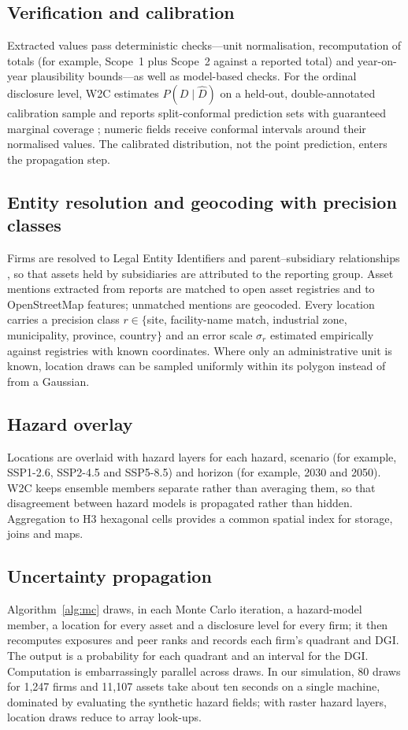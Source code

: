 \documentclass{article}
\theoremstyle{plain}
\theoremstyle{definition}
\begin{document}
\subsection{Verification and calibration}
Extracted values pass deterministic checks---unit normalisation, recomputation of totals (for example, Scope~1 plus Scope~2 against a reported total) and year-on-year plausibility bounds---as well as model-based checks. For the ordinal disclosure level, W2C estimates $P(D \mid \hat D)$ on a held-out, double-annotated calibration sample and reports split-conformal prediction sets with guaranteed marginal coverage \citep{angelopoulos2023gentle}; numeric fields receive conformal intervals around their normalised values. The calibrated distribution, not the point prediction, enters the propagation step.

\subsection{Entity resolution and geocoding with precision classes}
Firms are resolved to Legal Entity Identifiers and parent--subsidiary relationships \citep{gleif2024}, so that assets held by subsidiaries are attributed to the reporting group. Asset mentions extracted from reports are matched to open asset registries \citep{byers2018gppd,gem2024,climatetrace2024} and to OpenStreetMap features; unmatched mentions are geocoded. Every location carries a precision class $r \in \{$site, facility-name match, industrial zone, municipality, province, country$\}$ and an error scale $\sigma_r$ estimated empirically against registries with known coordinates. Where only an administrative unit is known, location draws can be sampled uniformly within its polygon instead of from a Gaussian.

\subsection{Hazard overlay}
Locations are overlaid with hazard layers for each hazard, scenario (for example, SSP1-2.6, SSP2-4.5 and SSP5-8.5) and horizon (for example, 2030 and 2050). W2C keeps ensemble members separate rather than averaging them, so that disagreement between hazard models is propagated rather than hidden. Aggregation to H3 hexagonal cells \citep{h3} provides a common spatial index for storage, joins and maps.

\subsection{Uncertainty propagation}
Algorithm~\ref{alg:mc} draws, in each Monte Carlo iteration, a hazard-model member, a location for every asset and a disclosure level for every firm; it then recomputes exposures and peer ranks and records each firm's quadrant and DGI. The output is a probability for each quadrant and an interval for the DGI. Computation is embarrassingly parallel across draws. In our simulation, 80 draws for 1,247 firms and 11,107 assets take about ten seconds on a single machine, dominated by evaluating the synthetic hazard fields; with raster hazard layers, location draws reduce to array look-ups.
\end{document}
